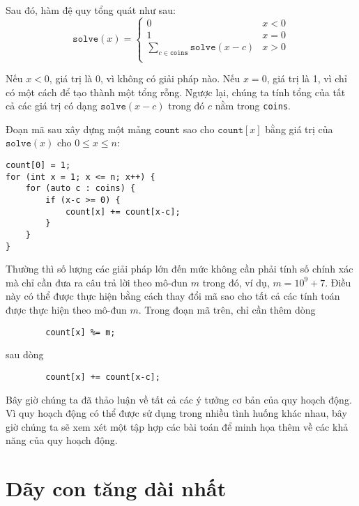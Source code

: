 Sau đó, hàm đệ quy tổng quát như sau:
\begin{equation*}
    \texttt{solve}(x) = \begin{cases}
               0               & x < 0\\
               1               & x = 0\\
               \sum_{c \in \texttt{coins}} \texttt{solve}(x-c) & x > 0 \\
           \end{cases}
\end{equation*}

Nếu $x<0$, giá trị là 0, vì không có giải pháp nào.
Nếu $x=0$, giá trị là 1, vì chỉ có một cách
để tạo thành một tổng rỗng.
Ngược lại, chúng ta tính tổng của tất cả các giá trị
có dạng $\texttt{solve}(x-c)$ trong đó $c$ nằm trong \texttt{coins}.

Đoạn mã sau xây dựng một mảng
$\texttt{count}$ sao cho
$\texttt{count}[x]$ bằng
giá trị của $\texttt{solve}(x)$
cho $0 \le x \le n$:

\begin{lstlisting}
count[0] = 1;
for (int x = 1; x <= n; x++) {
    for (auto c : coins) {
        if (x-c >= 0) {
            count[x] += count[x-c];
        }
    }
}
\end{lstlisting}

Thường thì số lượng các giải pháp lớn đến mức
không cần phải tính số chính xác
mà chỉ cần đưa ra câu trả lời theo mô-đun $m$
trong đó, ví dụ, $m=10^9+7$.
Điều này có thể được thực hiện bằng cách thay đổi mã sao cho
tất cả các tính toán được thực hiện theo mô-đun $m$.
Trong đoạn mã trên, chỉ cần thêm dòng
\begin{lstlisting}
        count[x] %= m;
\end{lstlisting}
sau dòng
\begin{lstlisting}
        count[x] += count[x-c];
\end{lstlisting}

Bây giờ chúng ta đã thảo luận về tất cả các ý tưởng cơ bản
của quy hoạch động.
Vì quy hoạch động có thể được sử dụng
trong nhiều tình huống khác nhau,
bây giờ chúng ta sẽ xem xét một tập hợp các bài toán
để minh họa thêm về các
khả năng của quy hoạch động.

\section{Dãy con tăng dài nhất}



